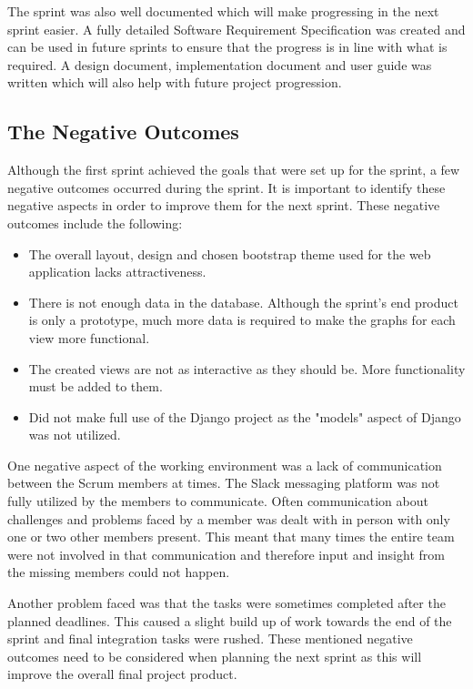 \documentclass[12pt,onecolumn]{article}
\begin{document}
	The sprint was also well documented which will make progressing in the next sprint easier. A fully detailed Software Requirement Specification was created and can be used in future sprints to ensure that the progress is in line with what is required. A design document, implementation document and user guide was written which will also help with future project progression. 
	
	\subsection{The Negative Outcomes} \label{neg}
	Although the first sprint achieved the goals that were set up for the sprint, a few negative outcomes occurred during the sprint. It is important to identify these negative aspects in order to improve them for the next sprint. These negative outcomes include the following:
	
	\begin{itemize}
		\item The overall layout, design and chosen bootstrap theme used for the web application lacks attractiveness.
		\item There is not enough data in the database. Although the sprint's end product is only a prototype, much more data is required to make the graphs for each view more functional.
		\item The created views are not as interactive as they should be. More functionality must be added to them.
		\item Did not make full use of the Django project as the "models" aspect of Django was not utilized. 
	\end{itemize}
	
	One negative aspect of the working environment was a lack of communication between the Scrum members at times. The Slack messaging platform was not fully utilized by the members to communicate. Often communication about challenges and problems faced by a member was dealt with in person with only one or two other members present. This meant that many times the entire team were not involved in that communication and therefore input and insight from the missing members could not happen. 
	
	Another problem faced was that the tasks were sometimes completed after the planned deadlines. This caused a slight build up of work towards the end of the sprint and final integration tasks were rushed. These mentioned negative outcomes need to be considered when planning the next sprint as this will improve the overall final project product.
	
\end{document}
